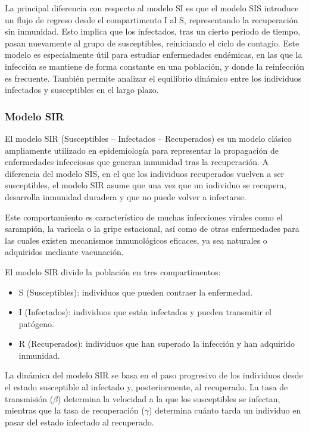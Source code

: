 \begin{enumerate}
La principal diferencia con respecto al modelo SI es que el modelo SIS introduce un flujo de regreso desde el compartimento I al S, representando la recuperación sin inmunidad. Esto implica que los infectados, tras un cierto periodo de tiempo, pasan nuevamente al grupo de susceptibles, reiniciando el ciclo de contagio.
Este modelo es especialmente útil para estudiar enfermedades endémicas, en las que la infección se mantiene de forma constante en una población, y donde la reinfección es frecuente. También permite analizar el equilibrio dinámico entre los individuos infectados y susceptibles en el largo plazo.


\subsubsection*{Modelo SIR}
El modelo SIR (Susceptibles – Infectados – Recuperados) es un modelo clásico ampliamente utilizado en epidemiología para representar la propagación de enfermedades infecciosas que generan inmunidad tras la recuperación. A diferencia del modelo SIS, en el que los individuos recuperados vuelven a ser susceptibles, el modelo SIR asume que una vez que un individuo se recupera, desarrolla inmunidad duradera y que no puede volver a infectarse.

Este comportamiento es característico de muchas infecciones virales como el sarampión, la varicela o la gripe estacional, así como de otras enfermedades para las cuales existen mecanismos inmunológicos eficaces, ya sea naturales o adquiridos mediante vacunación.

El modelo SIR divide la población en tres compartimentos:
\begin{itemize}
    \item S (Susceptibles): individuos que pueden contraer la enfermedad.
    \item I (Infectados): individuos que están infectados y pueden transmitir el patógeno.
    \item R (Recuperados): individuos que han superado la infección y han adquirido inmunidad.
\end{itemize}

La dinámica del modelo SIR se basa en el paso progresivo de los individuos desde el estado susceptible al infectado y, posteriormente, al recuperado. La tasa de transmisión ($\beta$) determina la velocidad a la que los susceptibles se infectan, mientras que la tasa de recuperación ($\gamma$) determina cuánto tarda un individuo en pasar del estado infectado al recuperado.


\end{enumerate}
